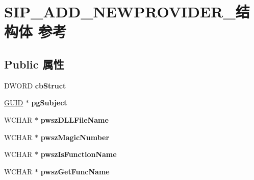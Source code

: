 \hypertarget{struct_s_i_p___a_d_d___n_e_w_p_r_o_v_i_d_e_r__}{}\section{S\+I\+P\+\_\+\+A\+D\+D\+\_\+\+N\+E\+W\+P\+R\+O\+V\+I\+D\+E\+R\+\_\+结构体 参考}
\label{struct_s_i_p___a_d_d___n_e_w_p_r_o_v_i_d_e_r__}
\subsection*{Public 属性}
\begin{DoxyCompactItemize}
\item 
\mbox{\label{struct_s_i_p___a_d_d___n_e_w_p_r_o_v_i_d_e_r___a30837128269fc7b6822ff2d5736feb8e}} 
D\+W\+O\+RD {\bfseries cb\+Struct}
\item 
\mbox{\label{struct_s_i_p___a_d_d___n_e_w_p_r_o_v_i_d_e_r___a40ceb7002c4cfd3e32df190c1a1b6fa1}} 
\hyperlink{interface_g_u_i_d}{G\+U\+ID} $\ast$ {\bfseries pg\+Subject}
\item 
\mbox{\label{struct_s_i_p___a_d_d___n_e_w_p_r_o_v_i_d_e_r___afbd8f3a0cbea67cc1199ae4258a6921c}} 
W\+C\+H\+AR $\ast$ {\bfseries pwsz\+D\+L\+L\+File\+Name}
\item 
\mbox{\label{struct_s_i_p___a_d_d___n_e_w_p_r_o_v_i_d_e_r___aa0a74563835e73dff0bf83ed2ccd3527}} 
W\+C\+H\+AR $\ast$ {\bfseries pwsz\+Magic\+Number}
\item 
\mbox{\label{struct_s_i_p___a_d_d___n_e_w_p_r_o_v_i_d_e_r___acbd810089f373a6dd0cf03480bb61104}} 
W\+C\+H\+AR $\ast$ {\bfseries pwsz\+Is\+Function\+Name}
\item 
\mbox{\label{struct_s_i_p___a_d_d___n_e_w_p_r_o_v_i_d_e_r___acc4776e1d25d3403162a91d53d7cc8c9}} 
W\+C\+H\+AR $\ast$ {\bfseries pwsz\+Get\+Func\+Name}
\item 
\mbox{\label{struct_s_i_p___a_d_d___n_e_w_p_r_o_v_i_d_e_r___a22f2d81305e55a9c51fd5b9d6cab66b6}} 

\end{DoxyCompactItemize}
